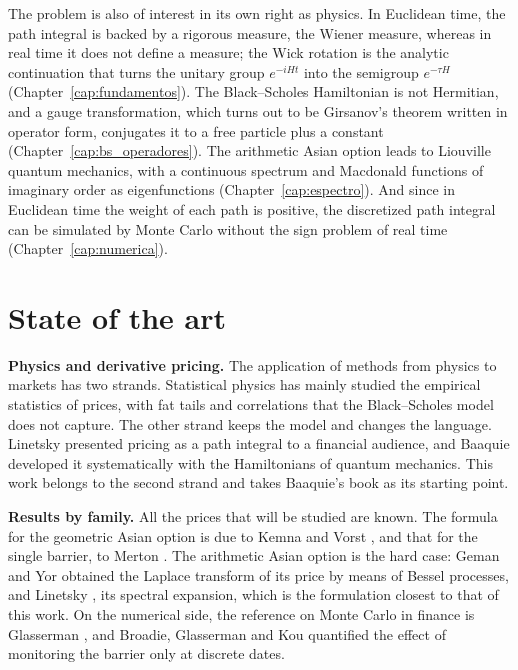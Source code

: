 The problem is also of interest in its own right as physics. In
Euclidean time, the path integral is backed by a rigorous measure, the
Wiener measure, whereas in real time it does not define a measure; the
Wick rotation is the analytic continuation that turns the unitary group
$e^{-iHt}$ into the semigroup $e^{-\tau H}$
(Chapter~\ref{cap:fundamentos}\enprep). The Black--Scholes Hamiltonian
is not Hermitian, and a gauge transformation, which turns out to be
Girsanov's theorem written in operator form, conjugates it to a free
particle plus a constant (Chapter~\ref{cap:bs_operadores}\enprep). The
arithmetic Asian option leads to Liouville quantum mechanics, with a
continuous spectrum and Macdonald functions of imaginary order as
eigenfunctions (Chapter~\ref{cap:espectro}\enprep). And since in
Euclidean time the weight of each path is positive, the discretized path
integral can be simulated by Monte Carlo without the sign problem of
real time (Chapter~\ref{cap:numerica}\enprep).

\section{State of the art}
\label{sec:estado_arte}

\noindent\textbf{Physics and derivative pricing.}
The application of methods from physics to markets has two strands.
Statistical physics has mainly studied the empirical statistics of
prices, with fat tails and correlations that the Black--Scholes model
does not capture. The other strand keeps the model and changes the
language. Linetsky \cite{linetsky1998} presented pricing as a path
integral to a financial audience, and Baaquie \cite{baaquie2004}
developed it systematically with the Hamiltonians of quantum mechanics.
This work belongs to the second strand and takes Baaquie's book as its
starting point.

\medskip

\noindent\textbf{Results by family.}
All the prices that will be studied are known. The formula for the
geometric Asian option is due to Kemna and Vorst \cite{kemna-vorst},
and that for the single barrier, to Merton \cite{merton1973}. The
arithmetic Asian option is the hard case: Geman and Yor
\cite{geman-yor} obtained the Laplace transform of its price by means of
Bessel processes, and Linetsky \cite{linetsky2004}, its spectral
expansion, which is the formulation closest to that of this work. On the
numerical side, the reference on Monte Carlo in finance is Glasserman
\cite{glasserman}, and Broadie, Glasserman and Kou
\cite{broadie-glasserman-kou} quantified the effect of monitoring the
barrier only at discrete dates.

